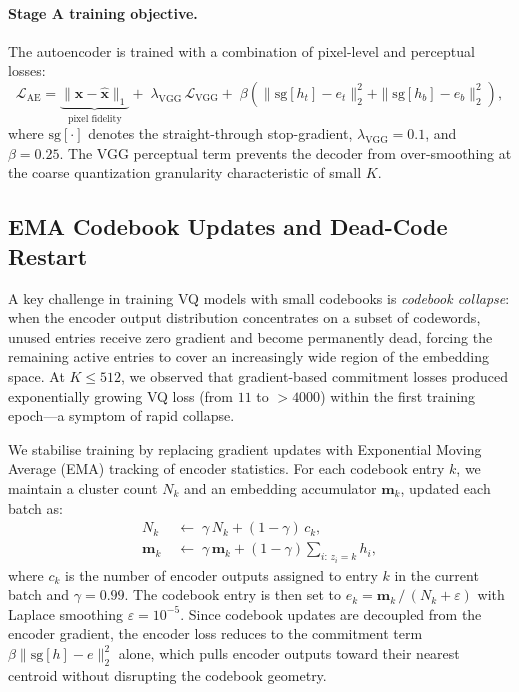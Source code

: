 \documentclass{article}
\begin{document}
\paragraph{Stage A training objective.}
The autoencoder is trained with a combination of pixel-level and perceptual
losses:
\begin{equation}
  \mathcal{L}_\text{AE} =
    \underbrace{\|\mathbf{x} - \hat{\mathbf{x}}\|_1}_{\text{pixel fidelity}}
    + \;\lambda_\text{VGG}\,\mathcal{L}_\text{VGG}
    + \;\beta\!\left(\|\mathrm{sg}[h_t] - e_t\|_2^2
                     + \|\mathrm{sg}[h_b] - e_b\|_2^2\right),
\label{eq:lae}
\end{equation}
where $\mathrm{sg}[\cdot]$ denotes the straight-through stop-gradient,
$\lambda_\text{VGG}=0.1$, and $\beta=0.25$.
The VGG perceptual term prevents the decoder from over-smoothing at the
coarse quantization granularity characteristic of small $K$.

\subsection{EMA Codebook Updates and Dead-Code Restart}
\label{sec:ema}

A key challenge in training VQ models with small codebooks is
\emph{codebook collapse}: when the encoder output distribution concentrates
on a subset of codewords, unused entries receive zero gradient and become
permanently dead, forcing the remaining active entries to cover an
increasingly wide region of the embedding space.
At $K\leq 512$, we observed that gradient-based commitment losses produced
exponentially growing VQ loss (from $11$ to $>4000$) within the first
training epoch---a symptom of rapid collapse.

We stabilise training by replacing gradient updates with Exponential Moving
Average (EMA) tracking of encoder statistics.
For each codebook entry $k$, we maintain a cluster count $N_k$ and an
embedding accumulator $\mathbf{m}_k$, updated each batch as:
\begin{align}
  N_k &\;\leftarrow\; \gamma\, N_k + (1-\gamma)\, c_k,
  \label{eq:ema_n} \\
  \mathbf{m}_k &\;\leftarrow\; \gamma\, \mathbf{m}_k
    + (1-\gamma)\!\sum_{i:\,z_i=k} h_i,
  \label{eq:ema_m}
\end{align}
where $c_k$ is the number of encoder outputs assigned to entry $k$ in the
current batch and $\gamma=0.99$.
The codebook entry is then set to $e_k = \mathbf{m}_k\,/\,(N_k + \varepsilon)$
with Laplace smoothing $\varepsilon=10^{-5}$.
Since codebook updates are decoupled from the encoder gradient, the encoder
loss reduces to the commitment term $\beta\|\mathrm{sg}[h] - e\|_2^2$ alone,
which pulls encoder outputs toward their nearest centroid without disrupting
the codebook geometry.
\end{document}
